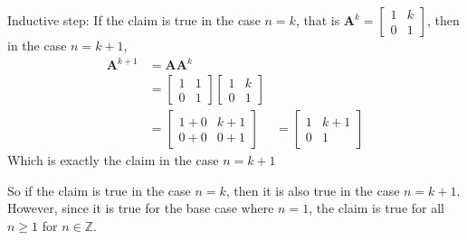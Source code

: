 \documentclass[11pt, a4paper]{article}
\begin{document}
Inductive step: If the claim is true in the case $n=k$, that is $\boldsymbol{A}^{k}=\begin{bmatrix}1&k\\0&1\end{bmatrix}$, then in the case $n=k+1$,
\begin{align*}
\boldsymbol{A}^{k+1}&=\boldsymbol{A}\boldsymbol{A}^{k} \\
&=\begin{bmatrix}1&1\\0&1\end{bmatrix}\begin{bmatrix}1&k\\0&1\end{bmatrix} \\
&=\begin{bmatrix}1+0&k+1\\0+0&0+1\end{bmatrix}
&=\begin{bmatrix}1&k+1\\0&1\end{bmatrix}
\end{align*}
Which is exactly the claim in the case $n=k+1$ \newline \par

So if the claim is true in the case $n=k$, then it is also true in the case $n=k+1$. However, since it is true for the base case where $n=1$, the claim is true for all $n\geq1$ for $n\in\mathbb{Z}$.

\vspace{0.5cm}
\end{document}
